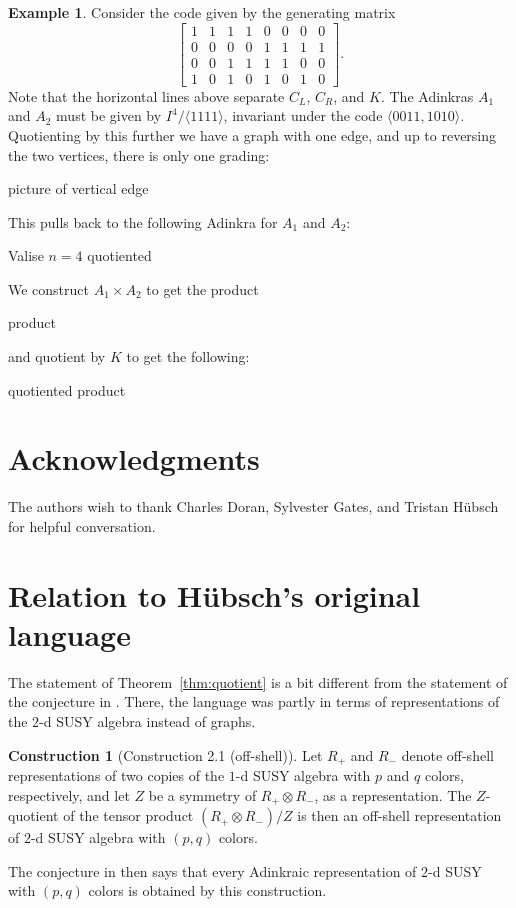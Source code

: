 \documentclass[12pt,twoside,singlespace]{article}
\numberwithin{equation}{section}
\theoremstyle{definition}
\newtheorem{ex}[equation]{Example}
\newtheorem{construction}[equation]{Construction}
\begin{document}
\begin{ex}
Consider the code given by the generating matrix
\[\left[\begin{array}{cccc|cccc}
1&1&1&1&0&0&0&0\\\hline
0&0&0&0&1&1&1&1\\\hline
0&0&1&1&1&1&0&0\\
1&0&1&0&1&0&1&0
\end{array}\right].\]
Note that the horizontal lines above separate $C_L$, $C_R$, and $K$.  The Adinkras $A_1$ and $A_2$ must be given by $I^4/\langle 1111\rangle$, invariant under the code $\langle 0011,1010\rangle$.  Quotienting by this further we have a graph with one edge, and up to reversing the two vertices, there is only one grading:
\begin{center}
picture of vertical edge
\end{center}
This pulls back to the following Adinkra for $A_1$ and $A_2$:
\begin{center}
Valise $n=4$ quotiented
\end{center}
We construct $A_1\times A_2$ to get the product
\begin{center}
product
\end{center}
and quotient by $K$ to get the following:
\begin{center}
quotiented product
\end{center}
\end{ex}

\section*{Acknowledgments}

The authors wish to thank Charles Doran, Sylvester Gates, and Tristan H\"ubsch for helpful conversation.

\appendix

\section{Relation to H\"ubsch's original language}
The statement of Theorem~\ref{thm:quotient} is a bit different from the statement of the conjecture in \cite{hubsch:weaving}.  There, the language was partly in terms of representations of the $2$-d SUSY algebra instead of graphs.
\begin{construction}[Construction 2.1 (off-shell)] Let $R_+$ and $R_-$ denote off-shell representations of two copies of the $1$-d SUSY algebra with $p$ and $q$ colors, respectively, and let $Z$ be a symmetry of $R_+ \otimes R_-$, as a representation. The $Z$-quotient of the tensor product $(R_+ \otimes R_-)/Z$ is then an off-shell representation of $2$-d SUSY algebra with $(p,q)$ colors.
\end{construction}
The conjecture in \cite{hubsch:weaving} then says that every Adinkraic representation of $2$-d SUSY with $(p,q)$ colors is obtained by this construction.
\end{document}
